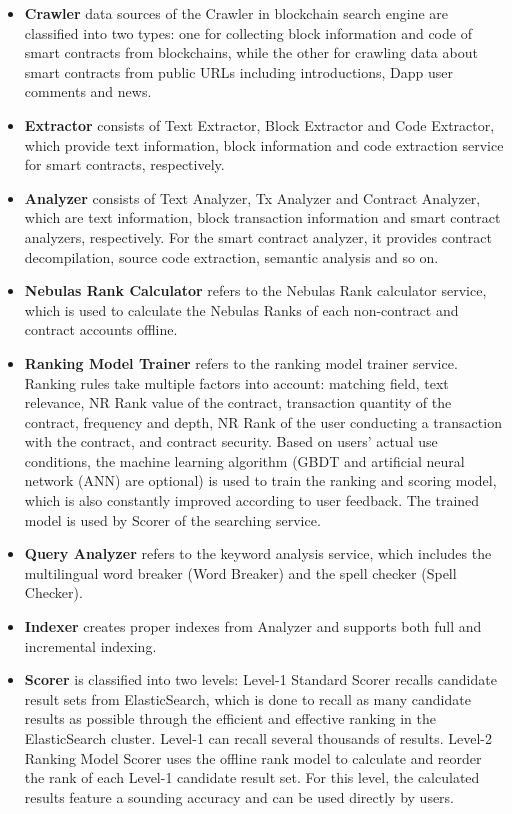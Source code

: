 \begin{itemize}
	\item \textbf{Crawler}  data sources of the Crawler in blockchain search engine are classified into two types: one for collecting block information and code of smart contracts from blockchains, while the other for crawling data about smart contracts from public URLs including introductions, Dapp user comments and news.

	\item \textbf{Extractor} consists of Text Extractor, Block Extractor and Code Extractor, which provide text information, block information and code extraction service for smart contracts, respectively.

	\item \textbf{Analyzer} consists of Text Analyzer, Tx Analyzer and Contract Analyzer, which are text information, block transaction information and smart contract analyzers, respectively. For the smart contract analyzer, it provides contract decompilation, source code extraction, semantic analysis and so on.

	\item \textbf{Nebulas Rank Calculator} refers to the Nebulas Rank calculator service, which is used to calculate the Nebulas Ranks of each non-contract and contract accounts offline.

	\item \textbf{Ranking Model Trainer} refers to the ranking model trainer service. Ranking rules take multiple factors into account: matching field, text relevance, NR Rank value of the contract, transaction quantity of the contract, frequency and depth, NR Rank of the user conducting a transaction with the contract, and contract security. Based on users' actual use conditions, the machine learning algorithm (GBDT and artificial neural network (ANN) are optional) is used to train the ranking and scoring model, which is also constantly improved according to user feedback. The trained model is used by Scorer of the searching service.

	\item \textbf{Query Analyzer} refers to the keyword analysis service, which includes the multilingual word breaker (Word Breaker) and the spell checker (Spell Checker).

	\item \textbf{Indexer} creates proper indexes from Analyzer and supports both full and incremental indexing.

	\item \textbf{Scorer} is classified into two levels: Level-1 Standard Scorer recalls candidate result sets from ElasticSearch, which is done to recall as many candidate results as possible through the efficient and effective ranking in the ElasticSearch cluster. Level-1 can recall several thousands of results. Level-2 Ranking Model Scorer uses the offline rank model to calculate and reorder the rank of each Level-1 candidate result set. For this level, the calculated results feature a sounding accuracy and can be used directly by users.


\end{itemize}
